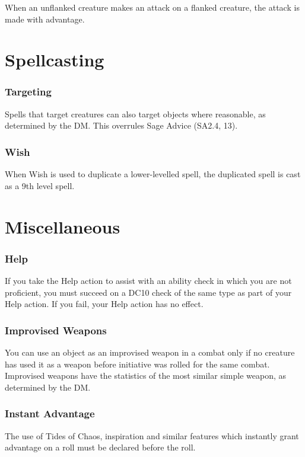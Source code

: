 \documentclass[letterpaper,twocolumn,openany,nodeprecatedcode]{dndbook}
\begin{document}
When an unflanked creature makes an attack on a flanked creature, the attack is made with advantage.




\section{Spellcasting}

\subsubsection{Targeting}
Spells that target creatures can also target objects where reasonable, as determined by the DM. This overrules Sage Advice (SA2.4, 13).

\subsubsection{Wish}
When Wish is used to duplicate a lower-levelled spell, the duplicated spell is cast as a 9th level spell.




\section{Miscellaneous}

\subsubsection{Help}
If you take the Help action to assist with an ability check in which you are not proficient, you must succeed on a DC10 check of the same type as part of your Help action. If you fail, your Help action has no effect.

\subsubsection{Improvised Weapons}
You can use an object as an improvised weapon in a combat only if no creature has used it as a weapon before initiative was rolled for the same combat. Improvised weapons have the statistics of the most similar simple weapon, as determined by the DM.

\subsubsection{Instant Advantage}
The use of Tides of Chaos, inspiration and similar features which instantly grant advantage on a roll must be declared before the roll.
\end{document}
